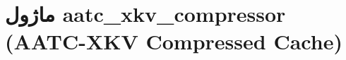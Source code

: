 \section{ماژول aatc\_xkv\_compressor (AATC-XKV Compressed Cache)}
\label{sec:module_aatc_xkv_compressor}
